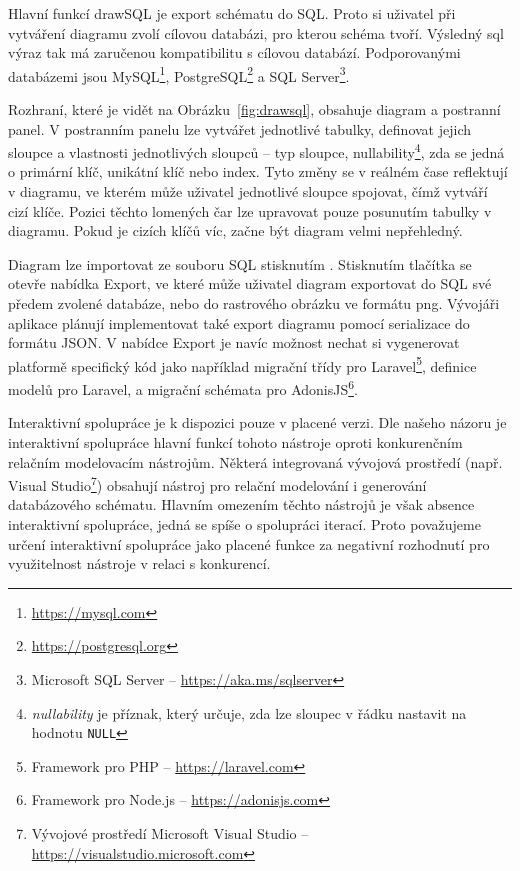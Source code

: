 Hlavní funkcí drawSQL je export schématu do SQL.
Proto si uživatel při vytváření diagramu zvolí cílovou databázi, pro kterou schéma tvoří.
Výsledný \acrshort{sql} výraz tak má zaručenou kompatibilitu s cílovou databází.
Podporovanými databázemi jsou
MySQL\footnote{\url{https://mysql.com}},
PostgreSQL\footnote{\url{https://postgresql.org}}
a SQL Server\footnote{Microsoft SQL Server -- \url{https://aka.ms/sqlserver}}.

Rozhraní, které je vidět na Obrázku~\ref{fig:drawsql}, obsahuje diagram a postranní panel.
V postranním panelu lze vytvářet jednotlivé tabulky, definovat jejich sloupce a vlastnosti jednotlivých sloupců -- typ sloupce,
nullability\footnote{\emph{nullability} je příznak, který určuje, zda lze sloupec v řádku nastavit na hodnotu \texttt{NULL}},
zda se jedná o primární klíč, unikátní klíč nebo index.
Tyto změny se v reálném čase reflektují v diagramu, ve kterém může uživatel jednotlivé sloupce spojovat, čímž vytváří cizí klíče.
Pozici těchto lomených čar lze upravovat pouze posunutím tabulky v diagramu.
Pokud je cizích klíčů víc, začne být diagram velmi nepřehledný.

Diagram lze importovat ze souboru SQL stisknutím .
Stisknutím tlačítka  se otevře nabídka Export, ve které může uživatel diagram exportovat do SQL své předem zvolené databáze, nebo do rastrového obrázku ve formátu \acrshort{png}.
Vývojáři aplikace plánují implementovat také export diagramu pomocí serializace do formátu JSON.
V nabídce Export je navíc možnost nechat si vygenerovat platformě specifický kód jako například migrační třídy pro
Laravel\footnote{Framework pro PHP -- \url{https://laravel.com}},
definice modelů pro Laravel, a migrační schémata pro
AdonisJS\footnote{Framework pro Node.js -- \url{https://adonisjs.com}}.

Interaktivní spolupráce je k dispozici pouze v placené verzi.
Dle našeho názoru je interaktivní spolupráce hlavní funkcí tohoto nástroje oproti konkurenčním relačním modelovacím nástrojům.
Některá integrovaná vývojová prostředí (např. Visual Studio\footnote{Vývojové prostředí Microsoft Visual Studio -- \url{https://visualstudio.microsoft.com}}) obsahují nástroj pro relační modelování i generování databázového schématu.
Hlavním omezením těchto nástrojů je však absence interaktivní spolupráce, jedná se spíše o spolupráci iterací.
Proto považujeme určení interaktivní spolupráce jako placené funkce za negativní rozhodnutí pro využitelnost nástroje v relaci s konkurencí.

